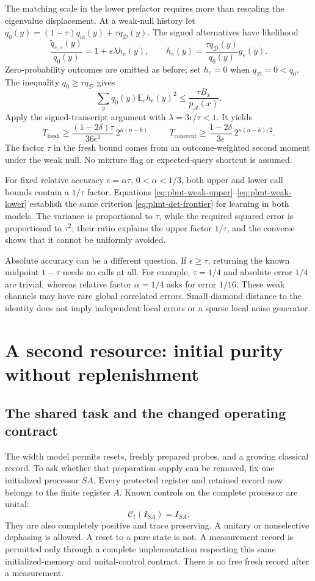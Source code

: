 \documentclass[11pt,a4paper]{article}
\numberwithin{equation}{section}
\theoremstyle{definition}
\theoremstyle{remark}
\newcommand{\Dep}{\mathcal D}
\begin{document}
The matching scale in the lower prefactor requires more than rescaling the eigenvalue displacement. At a weak-null history let
\(q_0(y)=(1-\tau)q_{\operatorname{id}}(y)+\tau q_{\Dep}(y)\).
The signed alternatives have likelihood
\[
 \frac{\widetilde q_{e,s}(y)}{q_0(y)}
 =1+s\lambda h_e(y),\qquad
 h_e(y)=\frac{\tau q_{\Dep}(y)}{q_0(y)}g_e(y).
\]
Zero-probability outcomes are omitted as before; set \(h_e=0\) when
\(q_{\Dep}=0<q_0\). The inequality \(q_0\geq\tau q_{\Dep}\) gives
\[
 \sum_yq_0(y)\mathbb E_eh_e(y)^2
 \leq\frac{\tau B_x}{p_{\mathcal A}(x)}.
\]
Apply the signed-transcript argument with \(\lambda=3\epsilon/\tau<1\).
It yields
\begin{equation}
 T_{\mathrm{fresh}}\geq
 \frac{(1-2\delta)\tau}{36\epsilon^2}\,2^{\kappa (n-k)},
 \qquad
 T_{\mathrm{coherent}}\geq
 \frac{1-2\delta}{3\epsilon}\,2^{\kappa (n-k)/2}.
 \label{eq:plmt-weak-lower}
\end{equation}
The factor \(\tau\) in the fresh bound comes from an outcome-weighted second moment under the weak null. No mixture flag or expected-query shortcut is assumed.

For fixed relative accuracy \(\epsilon=\alpha\tau\), \(0<\alpha<1/3\), both upper and lower call bounds contain a \(1/\tau\) factor. Equations
\eqref{eq:plmt-weak-upper}--\eqref{eq:plmt-weak-lower} establish the same criterion \eqref{eq:plmt-det-frontier} for learning in both models. The variance is proportional to \(\tau\), while the required squared error is proportional to \(\tau^2\); their ratio explains the upper factor \(1/\tau\), and the converse shows that it cannot be uniformly avoided.

Absolute accuracy can be a different question. If \(\epsilon\geq\tau\), returning the known midpoint \(1-\tau\) needs no calls at all. For example, \(\tau=1/4\) and absolute error \(1/4\) are trivial, whereas relative factor \(\alpha=1/4\) asks for error \(1/16\). These weak channels may have rare global correlated errors. Small diamond distance to the identity does not imply independent local errors or a sparse local noise generator.

\section{A second resource: initial purity without replenishment}
\subsection{The shared task and the changed operating contract}
The width model permits resets, freshly prepared probes, and a growing classical record. To ask whether that preparation supply can be removed, fix one initialized processor \(SA\). Every protected register and retained record now belongs to the finite register \(A\). Known controls on the complete processor are unital:
\[
 \mathcal C_t(I_{SA})=I_{SA}.
\]
They are also completely positive and trace preserving. A unitary or nonselective dephasing is allowed. A reset to a pure state is not. A measurement record is permitted only through a complete implementation respecting this same initialized-memory and unital-control contract. There is no free fresh record after a measurement.
\end{document}
